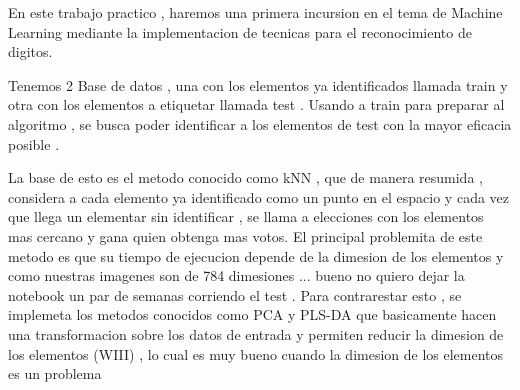 En este trabajo practico , haremos una primera incursion en el tema de Machine Learning mediante la implementacion de tecnicas para el reconocimiento de digitos.

Tenemos 2 Base de datos , una con los elementos ya identificados llamada train y otra con los elementos a etiquetar llamada test . Usando a train para preparar al algoritmo , se busca poder identificar a los elementos de test con la mayor eficacia posible .

La base de esto es el metodo conocido como kNN , que de manera resumida ,
considera a cada elemento ya identificado como un punto en el espacio y cada vez que llega un elementar sin identificar , se llama a elecciones con los elementos mas cercano y gana quien obtenga mas votos.
El principal problemita de este metodo es que su tiempo de ejecucion depende de la dimesion de los elementos y como nuestras imagenes son de 784 dimesiones ... bueno no quiero dejar la notebook un par de  semanas corriendo el test .
Para contrarestar esto , se implemeta los metodos conocidos como PCA 
y PLS-DA que basicamente hacen una transformacion sobre los datos de entrada y permiten reducir la dimesion de los elementos (WIII) , lo 
cual es muy bueno cuando la dimesion de los elementos es un problema



